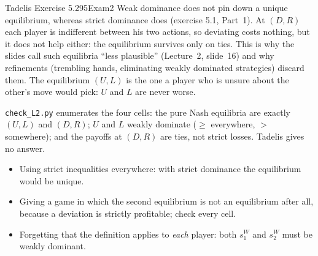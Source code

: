 \begin{exsol}{Tadelis Exercise 5.2}{95}{Exam}{2}
\interp Weak dominance does not pin down a unique equilibrium, whereas strict dominance does
(exercise 5.1, Part~1). At $(D,R)$ each player is indifferent between his two actions, so
deviating costs nothing, but it does not help either: the equilibrium survives only on ties. This is
why the slides call such equilibria ``less plausible'' (Lecture~2, slide~16) and why refinements
(trembling hands, eliminating weakly dominated strategies) discard them. The equilibrium $(U,L)$ is the
one a player who is unsure about the other's move would pick: $U$ and $L$ are never worse.

\verify \texttt{check\_L2.py} enumerates the four cells: the pure Nash equilibria are exactly
$(U,L)$ and $(D,R)$; $U$ and $L$ weakly dominate ($\ge$ everywhere, $>$ somewhere); and the
payoffs at $(D,R)$ are ties, not strict losses. Tadelis gives no answer.

\mistakes
\begin{itemize}
  \item Using strict inequalities everywhere: with strict dominance the equilibrium would be unique.
  \item Giving a game in which the second equilibrium is not an equilibrium after all, because a
  deviation is strictly profitable; check every cell.
  \item Forgetting that the definition applies to \emph{each} player: both $s_1^W$ and $s_2^W$ must
  be weakly dominant.
\end{itemize}
\end{exsol}
